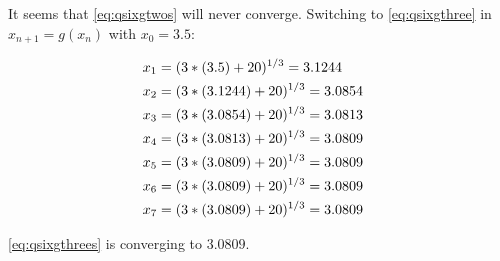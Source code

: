 	It seems that \cref{eq:qsixgtwos} will never converge. Switching to \cref{eq:qsixgthree} in $x_{n+1} = g(x_{n})$ with $x_{0} = 3.5$:

	\begin{align}
		x_{1} &= (3*(3.5) + 20)^{1/3} = 3.1244& \notag \\
		x_{2} &= (3*(3.1244) + 20)^{1/3} = 3.0854& \notag \\
		x_{3} &= (3*(3.0854) + 20)^{1/3} = 3.0813& \notag \\
		x_{4} &= (3*(3.0813) + 20)^{1/3} = 3.0809& \notag \\
		x_{5} &= (3*(3.0809) + 20)^{1/3} = 3.0809& \notag \\
		x_{6} &= (3*(3.0809) + 20)^{1/3} = 3.0809& \notag \\
		x_{7} &= (3*(3.0809) + 20)^{1/3} = 3.0809& \notag \\
		\label{eq:qsixgthrees}
	\end{align}

	\cref{eq:qsixgthrees} is converging to $3.0809$.